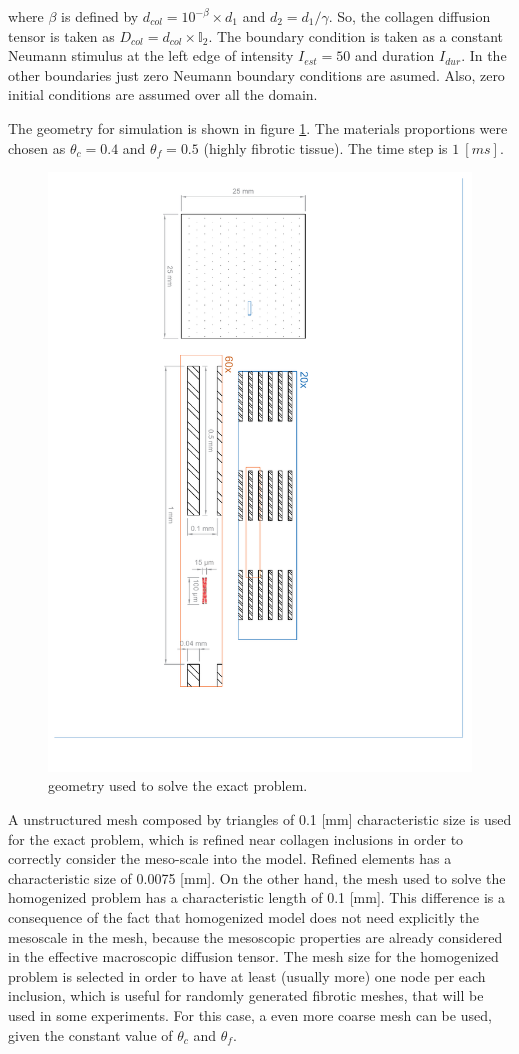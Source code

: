 where $\beta$ is defined by $d_{col} = 10^{-\beta} \times d_1$ and $d_2 = d_1/\gamma$. So, the collagen diffusion tensor is taken as $D_{col} = d_{col} \times \mathbb{I}_2$. The boundary condition is taken as a constant Neumann stimulus at the left edge of intensity $I_{est} = 50$ and duration $I_{dur}$. In the other boundaries just zero Neumann boundary conditions are asumed. Also, zero initial conditions are assumed over all the domain.

The geometry for simulation is shown in figure \ref{fig:geometry}. The materials proportions were chosen as $\theta_c = 0.4$ and $\theta_f = 0.5$ (highly fibrotic tissue). The time step is $1~[ms]$.

\begin{figure}[!htbp]
	\centering
	\includegraphics[trim={5cm 2cm 7cm 0.5cm}, clip, width = 5.4 cm, angle = 90]{fig/Verificacion_Teorema/geometry}
	\caption{geometry used to solve the exact problem. } \label{fig:geometry}
\end{figure}

A unstructured mesh composed by triangles of 0.1 [mm] characteristic size is used for the exact problem, which is refined near collagen inclusions in order to correctly consider the meso-scale into the model. Refined elements has a characteristic size of 0.0075 [mm]. On the other hand, the mesh used to solve the homogenized problem has a characteristic length of 0.1 [mm]. This difference is a consequence of the fact that homogenized model does not need explicitly the mesoscale in the mesh, because the mesoscopic properties are already considered in the effective macroscopic diffusion tensor. The mesh size for the homogenized problem is selected in order to have at least (usually more) one node per each inclusion, which is useful for randomly generated fibrotic meshes, that will be used in some experiments. For this case, a even more coarse mesh can be used, given the constant value of $\theta_c$ and $\theta_f$.

